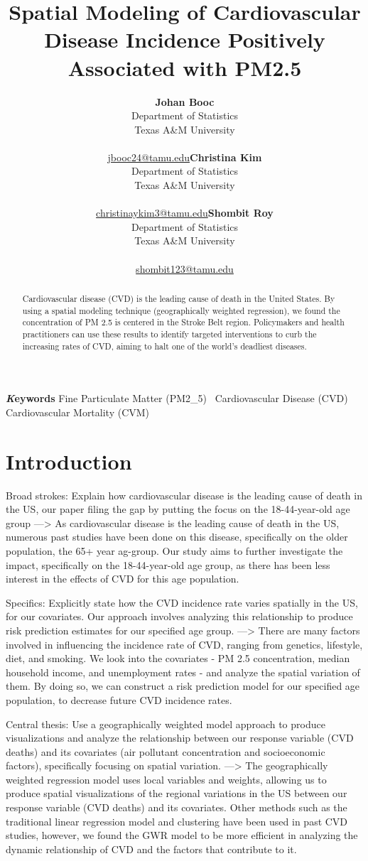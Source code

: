 \documentclass[
]{article}
\title{Spatial Modeling of Cardiovascular Disease Incidence Positively
Associated with PM2.5}
\author{\textbf{Johan Booc}\\Department of Statistics\\Texas A\&M
University\\\\\href{mailto:jbooc24@tamu.edu}{jbooc24@tamu.edu}\asep\textbf{Christina
Kim}\\Department of Statistics\\Texas A\&M
University\\\\\href{mailto:christinaykim3@tamu.edu}{christinaykim3@tamu.edu}\asep\textbf{Shombit
Roy}\\Department of Statistics\\Texas A\&M
University\\\\\href{mailto:shombit123@tamu.edu}{shombit123@tamu.edu}}
\date{}
\begin{document}
\maketitle
\begin{abstract}
Cardiovascular disease (CVD) is the leading cause of death in the United
States. By using a spatial modeling technique (geographically weighted
regression), we found the concentration of PM 2.5 is centered in the
Stroke Belt region. Policymakers and health practitioners can use these
results to identify targeted interventions to curb the increasing rates
of CVD, aiming to halt one of the world's deadliest diseases.
\end{abstract}
{\bfseries \emph Keywords}
\def\sep{\textbullet\ }
Fine Particulate Matter (PM2\_5) \sep Cardiovascular Disease (CVD) \sep 
Cardiovascular Mortality (CVM)


\section{Introduction}\label{sec-intro}

Broad strokes: Explain how cardiovascular disease is the leading cause
of death in the US, our paper filing the gap by putting the focus on the
18-44-year-old age group ---\textgreater{} As cardiovascular disease is
the leading cause of death in the US, numerous past studies have been
done on this disease, specifically on the older population, the 65+ year
ag-group. Our study aims to further investigate the impact, specifically
on the 18-44-year-old age group, as there has been less interest in the
effects of CVD for this age population.

Specifics: Explicitly state how the CVD incidence rate varies spatially
in the US, for our covariates. Our approach involves analyzing this
relationship to produce risk prediction estimates for our specified age
group. ---\textgreater{} There are many factors involved in influencing
the incidence rate of CVD, ranging from genetics, lifestyle, diet, and
smoking. We look into the covariates - PM 2.5 concentration, median
household income, and unemployment rates - and analyze the spatial
variation of them. By doing so, we can construct a risk prediction model
for our specified age population, to decrease future CVD incidence
rates.

Central thesis: Use a geographically weighted model approach to produce
visualizations and analyze the relationship between our response
variable (CVD deaths) and its covariates (air pollutant concentration
and socioeconomic factors), specifically focusing on spatial variation.
---\textgreater{} The geographically weighted regression model uses
local variables and weights, allowing us to produce spatial
visualizations of the regional variations in the US between our response
variable (CVD deaths) and its covariates. Other methods such as the
traditional linear regression model and clustering have been used in
past CVD studies, however, we found the GWR model to be more efficient
in analyzing the dynamic relationship of CVD and the factors that
contribute to it.
\end{document}
